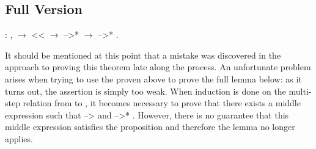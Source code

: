 \documentclass[12pt]{report}
\begin{document}
\subsection{Full Version}

\begin{coqdoccode}
\coqdocemptyline
\coqdocindent{1.00em}
  : \coqdockw{\ensuremath{\forall}}   ,\coqdoceol
\coqdocindent{2.00em}
  \ensuremath{\rightarrow}\coqdoceol
\coqdocindent{2.00em}
 <<  \ensuremath{\rightarrow}\coqdoceol
\coqdocindent{2.00em}
 -->*  \ensuremath{\rightarrow}\coqdoceol
\coqdocindent{2.00em}
 -->* .\coqdoceol
\coqdocemptyline
\end{coqdoccode}
It should be mentioned at this point that a mistake was
discovered in the approach to proving this theorem late along the
process. An unfortunate problem arises when trying to use the
 proven above to prove the full
 lemma below: as it turns out, the assertion is simply
too weak. When induction is done on the multi-step relation from 
to , it becomes necessary to prove that there exists a middle
expression  such that  -->  and  -->* . However, there is
no guarantee that this middle expression satisfies the 
proposition and therefore the  lemma no
longer applies. 
\end{document}
